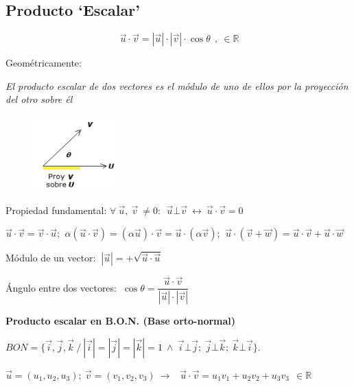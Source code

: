 \subsection{Producto `Escalar'}

\begin{equation}
	\boxed{\ \vec u \cdot \vec v = |\vec u| \cdot |\vec v| \cdot \cos \theta \ } \ ,\ \in \mathbb{R} 
\end{equation}			

\vspace{3mm}

\begin{multicols}{2}
Geométricamente:

\emph{El producto escalar de dos vectores es el módulo de uno de ellos por la proyección del otro sobre él}
\begin{figure}[H]
	\centering
	\includegraphics[width=0.30\textwidth]{imagenes/imagenes10/T10IM07.png}
\end{figure}
\end{multicols}


	Propiedad fundamental: $\forall \  \vec u,\ \vec v\ \neq 0:\ \boxed{\  \vec u \bot \vec v \ \leftrightarrow \ \vec u \cdot \vec v=0 \ }$
		
	$\vec u \cdot \vec v = \vec v \cdot \vec u$; $\ \alpha ( \vec u \cdot \vec v) =( \alpha \vec u) \cdot \vec v = \vec u \cdot ( \alpha \vec v)$; $\ \vec u \cdot (\vec v + \vec w)= \vec u \cdot \vec v + \vec u \cdot \vec w$
		
	 Módulo de un vector: $\boxed{ \ | \vec u |=+\sqrt{\vec u \cdot \vec u} \ }$
		
	 Ángulo entre dos vectores: $\boxed{ \ \cos \theta = \dfrac {\vec u \cdot \vec v}{|\vec u| \cdot |\vec v|} \ }$
	 
\vspace{4mm} \textbf{Producto escalar en B.O.N. \small{(Base orto-normal)}}

$BON=\{ \vec i, \vec j, \vec k \ / \  |\vec i|=|\vec j|=|\vec k|=1 \ \wedge \ \vec i \bot \vec j; \ \vec j \bot \vec k; \ \vec k \bot \vec i \}$. 

$\vec u=(u_1,u_2,u_3); \ \vec v=(v_1, v_2, v_3) \ \to \ $
$\boxed{  \ \vec u \cdot \vec v= u_1 v_1+u_2 v_2+u_3 v_3 \ }  \  \in \mathbb{R}$

